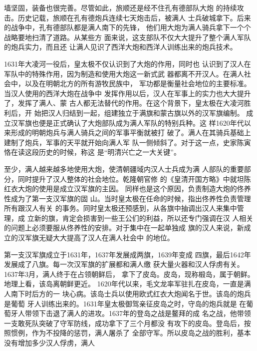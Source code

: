 墙坚固，装备也很完善。尽管如此，旅顺还是经不住孔有德部队大炮%
的持续攻击。历史记载，旅顺在孔有德炮兵连续七天炮击后，被满人%
士兵破城拿下。后来的战争中，孔有德部队都是满人南下的先锋，%
他们用大炮为满人骑兵拿下一个个战略要地扫清了道路。从某些方%
面来说，这支部队不仅大大提升了整个满人军队的炮兵实力，而且还%
让满人见识了西洋大炮和西洋人训练出来的炮兵技术。%
\par
1631年大凌河一役后，皇太极不仅认识到了大炮的作用，同时也%
认识到了汉人在军队中的特殊作用，因为制造和使用大炮这一新式武%
器都离不开汉人。在满人社会中，以及在明朝北方的所有游牧民族中，%
军功都是衡量社会地位的主要标准。当汉人使用的西洋大炮在战争中%
发挥作用以后，汉人在军事上的实力也大大提升了，发挥了满人、蒙%
古人都无法替代的作用。在这个背景下，皇太极在大凌河胜利后，开%
始把汉人归结到一起，组建独立于满旗和蒙古旗以外的汉军旗编制。%
成立汉军旗也便是正式确认了大炮部队成为满人军队的特别兵种。这%
样1620年代以来形成的明朝炮兵与满人骑兵之间的军事平衡就被打%
破了。满人在其骑兵基础上建制了炮兵，军事的天平就开始向满人军%
队一侧倾斜了。对于这一点，史家陈寅恪在读这段历史的时候，称这%
是“明清兴亡之一大关键”。%
\par
至少，满人越来越多地使用大炮，使清朝疆域内汉人士兵成为满%
人部队的重要部分，同时提升了汉人整体的社会地位。乾隆朝官修%
的《皇清开国方略》中就坦陈红衣大炮的使用是成立汉军旗的主因。%
同样也是这个原因，负责制造大炮的佟养性成为了第一支汉军旗的固%
山。当时皇太极在任命的时候，指出佟养性负责管理所有跟汉人有关%
的事务。同时皇太极还预感到，从各旗中抽调出汉人来集中管理，成%
立新的旗，肯定会损害到一些王公们的利益，所以还专门强调在汉%
人相关的问题上必须要服从佟养性的安排。对于集中在一起单独成%
旗的汉人来说，新成立的汉军旗无疑大大提高了汉人在满人社会中%
的地位。%
\par
第一支汉军旗成立于1631年，1637年发展成两旗，1639年变成%
四旗，最后1642年发展成了八旗。每一次汉军旗的扩展都和满人缴%
获大量火器和汉人俘虏有关。1637年3月，满人终于在占领朝鲜后，%
拿下了皮岛。皮岛，现称椴岛，属于朝鲜。地理上看，该岛离朝鲜更近。%
1620年代以来，毛文龙率军驻扎在皮岛，一直是满人南下时后方的一%
块心病。该岛士兵以使用欧式红衣大炮闻名于世。该岛的炮兵是葡萄%
牙人训练出来的。1631年皇太极御驾亲征皮岛之时，守岛的炮兵就是%
在葡萄牙人带领下击退了满人的进攻。1637年的登岛之战是鳌拜的成%
名之战，他带领一支敢死队突破了守军防线，成功拿下了三个月都没%
有攻下的皮岛。登岛后，按照惯例，作为不投降的惩罚，满人屠杀了%
全部守军。所以皮岛之战的胜利，基本没有增加多少汉人俘虏，满人%
